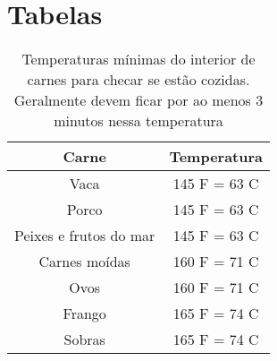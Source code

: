 \section{Tabelas}
\begin{table}[h]
	\centering
	\begin{tabular}[h]{c c}
		\hline
		Carne                  & Temperatura              \\
		\hline
		Vaca                   & 145 \grau F = 63 \grau C \\
		Porco                  & 145 \grau F = 63 \grau C \\
		Peixes e frutos do mar & 145 \grau F = 63 \grau C \\
		Carnes moídas          & 160 \grau F = 71 \grau C \\
		Ovos                   & 160 \grau F = 71 \grau C \\
		Frango                 & 165 \grau F = 74 \grau C \\
		Sobras                 & 165 \grau F = 74 \grau C \\
		\hline
	\end{tabular}
	\caption{Temperaturas mínimas do interior de carnes para checar se estão cozidas.
		Geralmente devem ficar por ao menos 3 minutos nessa temperatura}
	\label{tab:temperaturas_cozimento}
\end{table}

